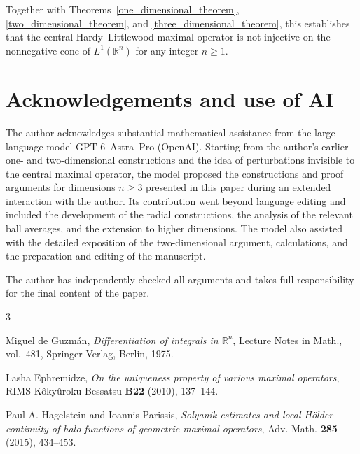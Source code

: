 \documentclass[12pt]{amsart}
\numberwithin{equation}{section}
\begin{document}
Together with Theorems~\ref{one_dimensional_theorem},
\ref{two_dimensional_theorem}, and \ref{three_dimensional_theorem},
this establishes that the central Hardy--Littlewood maximal operator
is not injective on the nonnegative cone of $L^1(\mathbb{R}^n)$ for
any integer $n\geq1$.


\section*{Acknowledgements and use of AI}

The author acknowledges substantial mathematical assistance from the
large language model \mbox{GPT-6 Astra Pro} (OpenAI). Starting from the author's earlier
one- and two-dimensional constructions and the idea of perturbations
invisible to the central maximal operator, the model proposed the
constructions and proof arguments for dimensions $n\geq3$ presented in
this paper during an extended interaction with the author. Its
contribution went beyond language editing and included the development
of the radial constructions, the analysis of the relevant ball averages,
and the extension to higher dimensions. The model also assisted with
the detailed exposition of the two-dimensional argument, calculations,
and the preparation and editing of the manuscript.

The author has independently checked all arguments and takes full
responsibility for the final content of the paper.

\begin{thebibliography}{3}

Miguel de Guzm\'an, \emph{Differentiation of integrals in $\mathbb{R}^n$},
Lecture Notes in Math., vol.~481, Springer-Verlag, Berlin, 1975.

Lasha Ephremidze, \emph{On the uniqueness property of various maximal operators},
RIMS K\^oky\^uroku Bessatsu \textbf{B22} (2010), 137--144.

Paul A. Hagelstein and Ioannis Parissis,
\emph{Solyanik estimates and local H\"older continuity of halo functions
of geometric maximal operators},
Adv. Math. \textbf{285} (2015), 434--453.

\end{thebibliography}
\end{document}

